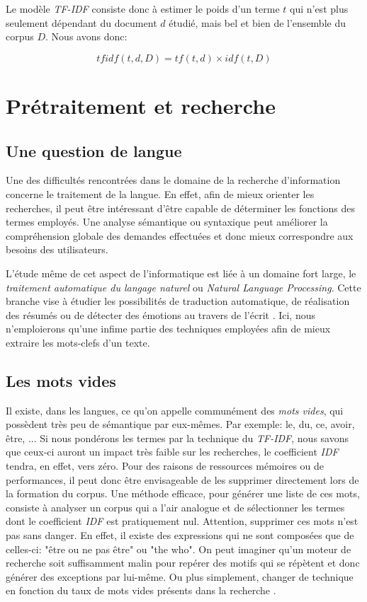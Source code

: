 Le modèle \textit{TF-IDF} consiste donc à estimer le poids d'un terme $t$ qui n'est plus seulement dépendant du document $d$ étudié, mais bel et bien de l'ensemble du corpus $D$. Nous avons donc:

$$ tfidf(t, d, D) = tf(t,d) \times idf(t, D) $$

\section{Prétraitement et recherche}

\subsection{Une question de langue}

Une des difficultés rencontrées dans le domaine de la recherche d'information concerne le traitement de la langue. En effet, afin de mieux orienter les recherches, il peut être intéressant d'être capable de déterminer les fonctions des termes employés. Une analyse sémantique ou syntaxique peut améliorer la compréhension globale des demandes effectuées et donc mieux correspondre aux besoins des utilisateurs.

L'étude même de cet aspect de l'informatique est liée à un domaine fort large, le \textit{traitement automatique du langage naturel} ou \textit{Natural Language Processing}. Cette branche vise à étudier les possibilités de traduction automatique, de réalisation des résumés ou de détecter des émotions au travers de l'écrit \cite{manning1999foundations}. Ici, nous n'emploierons qu'une infime partie des techniques employées afin de mieux extraire les mots-clefs d'un texte.

\subsection{Les mots vides}

Il existe, dans les langues, ce qu'on appelle communément des \textit{mots vides}, qui possèdent très peu de sémantique par eux-mêmes. Par exemple: le, du, ce, avoir, être, ... Si nous pondérons les termes par la technique du \textit{TF-IDF}, nous savons que ceux-ci auront un impact très faible sur les recherches, le coefficient \textit{IDF} tendra, en effet, vers zéro. Pour des raisons de ressources mémoires ou de performances, il peut donc être envisageable de les supprimer directement lors de la formation du corpus. Une méthode efficace, pour générer une liste de ces mots, consiste à analyser un corpus qui a l'air analogue et de sélectionner les termes dont le coefficient \textit{IDF} est pratiquement nul. Attention, supprimer ces mots n'est pas sans danger. En effet, il existe des expressions qui ne sont composées que de celles-ci: "être ou ne pas être" ou "the who". On peut imaginer qu'un moteur de recherche soit suffisamment malin pour repérer des motifs qui se répètent et donc générer des exceptions par lui-même. Ou plus simplement, changer de technique en fonction du taux de mots vides présents dans la recherche \cite{tong2011locating}.

